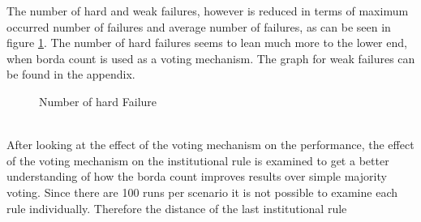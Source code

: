 \documentclass[a4paper]{article}
\begin{document}
The number of hard and weak failures, however is reduced in terms of maximum occurred number of failures and 
average number of failures, as can be seen in figure \ref{d_hard}. The number of hard failures seems to lean 
much more to the lower end, when borda count is used as a voting mechanism. The graph for weak failures can be found 
in the appendix. \\
\begin{figure}[!ht]
\caption{Number of hard Failure}
\label{d_hard}
\end{figure}\\
After looking at the effect of the voting mechanism on the performance, the effect of the voting mechanism on the institutional rule 
is examined to get a better understanding of how the borda count improves results over simple majority voting. Since there are 
100 runs per scenario it is not possible to examine each rule individually. Therefore the distance of the last institutional rule 
\end{document}
